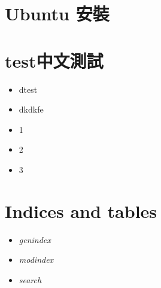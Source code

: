 \documentclass[letterpaper,10pt,english]{sphinxmanual}
\begin{document}
\chapter{Ubuntu 安裝}
\label{_doc/ubuntu/index:ubuntu}\label{_doc/ubuntu/index::doc}

\chapter{test中文測試}
\label{_doc/test/index:test}\label{_doc/test/index::doc}\begin{itemize}
\item {} 
dtest

\item {} 
dkdkfe

\item {} 
1

\item {} 
2

\item {} 
3

\end{itemize}


\chapter{Indices and tables}
\label{index:indices-and-tables}\begin{itemize}
\item {} 
\emph{genindex}

\item {} 
\emph{modindex}

\item {} 
\emph{search}

\end{itemize}



\renewcommand{\indexname}{Index}
\printindex
\end{document}
